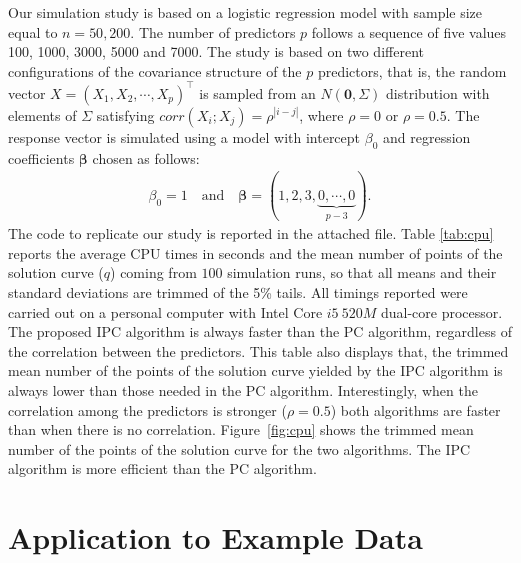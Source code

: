 Our simulation study is based on a logistic regression model with sample size equal to $n=50, 200$. The number of predictors $p$ follows a sequence of five values 100, 1000, 3000, 5000 and 7000. The study is based on two different configurations of the covariance structure of the $ p $ predictors, that is, the random vector $X=(X_1, X_2, \cdots ,X_p)^\top$ is sampled from an $ N (\boldsymbol{0}, \Sigma) $ distribution with elements of $ \Sigma $ satisfying $corr(X_i;X_j)=\rho^{|i-j|}$, where $\rho=0$ or $\rho= 0.5$. The response vector is simulated using a model with intercept $\beta_0$ and regression coefficients $\bm\beta$ chosen as follows:
%
\begin{align*}
\beta_0 = 1\quad\text{and}\quad\boldsymbol{\beta}=(1, 2, 3, \underset{p-3}{\underbrace{0, \cdots, 0}}).
\end{align*}
%
The  code to replicate our study is reported in the attached file. Table \ref{tab:cpu} reports the average CPU times in seconds and the mean number of points of the solution curve ($q$) coming from $100$ simulation runs, so that all means and their standard deviations are trimmed of the 5\% tails. All timings reported were carried out on a personal computer with Intel Core $i5 \ 520M$ dual-core processor. 
The proposed IPC algorithm is always faster than the PC algorithm, regardless of the correlation between the predictors. This table also displays that, the trimmed mean number of the points of the solution curve yielded by the IPC algorithm is always lower than those needed in the PC algorithm. 
Interestingly, when the correlation among the predictors is stronger ($\rho=0.5$) both algorithms are faster than when there is no correlation. Figure~\ref{fig:cpu} shows the trimmed mean number of the points of the solution curve for the two algorithms. The IPC algorithm is more efficient than the PC algorithm. 


\section[Application to Example Data]{Application to Example Data}
\label{sec:realdata}



